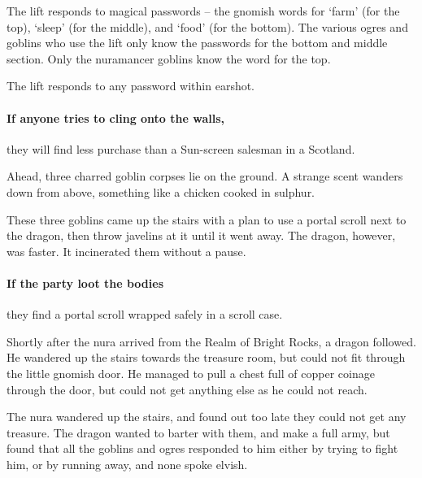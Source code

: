 \begin{multicols}{2}
The lift responds to magical passwords -- the gnomish words for `farm' (for the top), `sleep' (for the middle), and `food' (for the bottom).
The various ogres and goblins who use the lift only know the passwords for the bottom and middle section.
Only the nuramancer goblins know the word for the top.

The lift responds to any password within earshot.

\paragraph{If anyone tries to cling onto the walls,}
they will find less purchase than a Sun-screen salesman in a Scotland.



\begin{boxtext}

	Ahead, three charred goblin corpses lie on the ground.
	A strange scent wanders down from above, something like a chicken cooked in sulphur.

\end{boxtext}

\begin{exampletext}

	These three goblins came up the stairs with a plan to use a portal scroll next to the dragon, then throw javelins at it until it went away.
	The dragon, however, was faster.
	It incinerated them without a pause.

\end{exampletext}

\paragraph{If the party loot the bodies}
they find a portal scroll wrapped safely in a scroll case.

\label{dragon}

\begin{exampletext}

	Shortly after the nura arrived from the Realm of Bright Rocks, a dragon followed.
	He wandered up the stairs towards the treasure room, but could not fit through the little gnomish door.
	He managed to pull a chest full of copper coinage through the door, but could not get anything else as he could not reach.

	The nura wandered up the stairs, and found out too late they could not get any treasure.
	The dragon wanted to barter with them, and make a full army, but found that all the goblins and ogres responded to him either by trying to fight him, or by running away, and none spoke elvish.


\end{exampletext}
\end{multicols}
